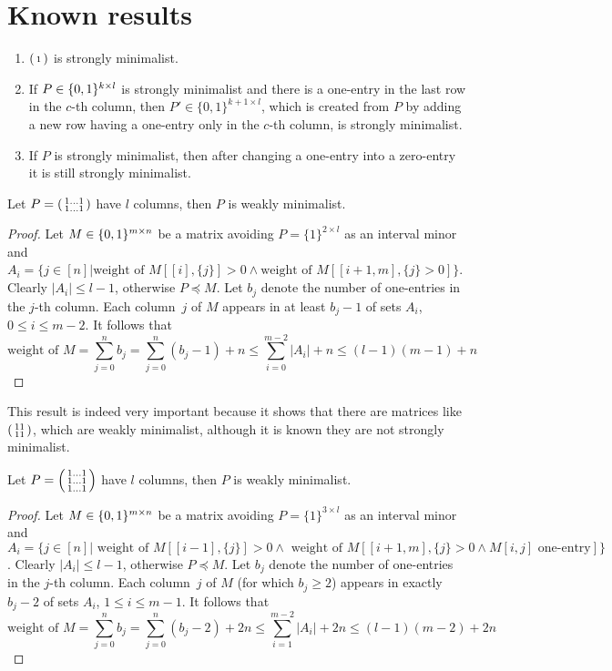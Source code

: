 \section{Known results}
\begin{fct}
\begin{enumerate}
\item $\left(\begin{smallmatrix}1\end{smallmatrix}\right)$ is strongly minimalist.
\item If $P\in\{0,1\}^{k\times l}$ is strongly minimalist and there is a one-entry in the last row in the $c$-th column, then $P'\in\{0,1\}^{k+1\times l}$, which is created from $P$ by adding a new row having a one-entry only in the $c$-th column, is strongly minimalist.
\item If $P$ is strongly minimalist, then after changing a one-entry into a zero-entry it is still strongly minimalist.
\end{enumerate}
\end{fct}
\begin{fct}
Let $P=\left(\begin{smallmatrix}1\dots1\\1\dots1\end{smallmatrix}\right)$ have $l$ columns, then $P$ is weakly minimalist.
\end{fct}
\begin{proof}
Let $M\in\{0,1\}^{m\times n}$ be a matrix avoiding $P=\{1\}^{2\times l}$ as an interval minor and $A_i=\{j\in[n]|\text{weight of }M[[i],\{j\}]>0\wedge \text{weight of }M[[i+1,m],\{j\}>0]\}$. Clearly $|A_i|\leq l-1$, otherwise $P\preceq M$. Let $b_j$ denote the number of one-entries in the $j$-th column. Each column~$j$ of $M$ appears in at least $b_j-1$ of sets $A_i$, $0\leq i\leq m-2$. It follows that
$$\text{weight of }M=\sum\limits_{j=0}^nb_j=\sum\limits_{j=0}^n(b_j-1)+n\leq\sum\limits_{i=0}^{m-2}|A_i|+n\leq(l-1)(m-1)+n$$
\end{proof}
This result is indeed very important because it shows that there are matrices like $\left(\begin{smallmatrix}11\\11\end{smallmatrix}\right)$, which are weakly minimalist, although it is known they are not strongly minimalist.
\begin{fct}
Let $P=\left(\begin{smallmatrix}1\dots1\\1\dots1\\1\dots1\end{smallmatrix}\right)$ have $l$ columns, then $P$ is weakly minimalist.
\end{fct}
\begin{proof}
Let $M\in\{0,1\}^{m\times n}$ be a matrix avoiding $P=\{1\}^{3\times l}$ as an interval minor and $A_i=\{j\in[n]|\text{ weight of }M[[i-1],\{j\}]>0\wedge \text{ weight of }M[[i+1,m],\{j\}>0\wedge M[i,j]\text{ one-entry}]\}$. Clearly $|A_i|\leq l-1$, otherwise $P\preceq M$. Let $b_j$ denote the number of one-entries in the $j$-th column. Each column~$j$ of $M$ (for which $b_j\geq2$) appears in exactly $b_j-2$ of sets $A_i$, $1\leq i\leq m-1$. It follows that
$$\text{weight of }M=\sum\limits_{j=0}^nb_j=\sum\limits_{j=0}^n(b_j-2)+2n\leq\sum\limits_{i=1}^{m-2}|A_i|+2n\leq(l-1)(m-2)+2n$$
\end{proof}